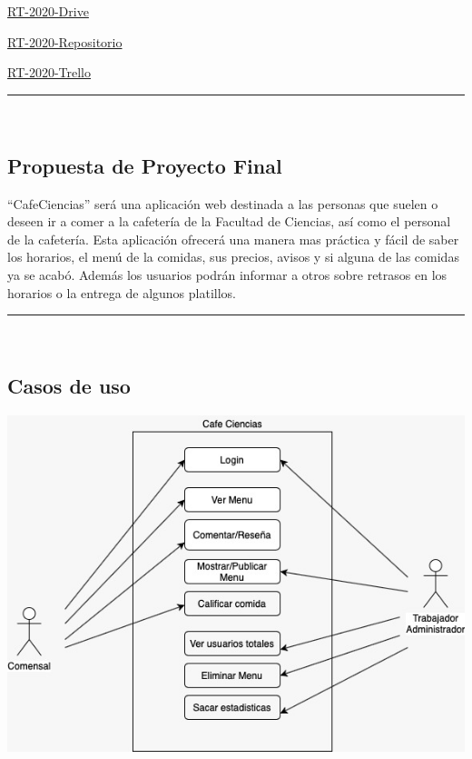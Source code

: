\documentclass{article}
\begin{document}
\href{https://drive.google.com/open?id=13f9jp3Oli6AQF1Ap8VhoEKFXTPULumos}{RT-2020-Drive}

\href{https://github.com/mildewyPrawn/CafeCiencias}{RT-2020-Repositorio}

\href{https://trello.com/b/rwdAGuSi/cafeciencias}{RT-2020-Trello}

\rule{0.8\textwidth}{.8pt}\\

\subsection*{Propuesta de Proyecto Final}

“CafeCiencias” será una aplicación web destinada a las personas que suelen o
deseen ir a comer a la cafetería de la Facultad de Ciencias, así como el personal
de la cafetería. Esta aplicación ofrecerá una manera mas práctica y fácil de
saber los horarios, el menú de la comidas, sus precios, avisos y si alguna de las
comidas ya se  acabó. Además los usuarios podrán informar a otros sobre retrasos
en los horarios o la entrega de algunos platillos.

\rule{0.8\textwidth}{.8pt}\\

\subsection*{Casos de uso}

\begin{center}
  \includegraphics[scale=.75]{../imagenes/CasoDeUsos.jpg}
\end{center}
\end{document}
